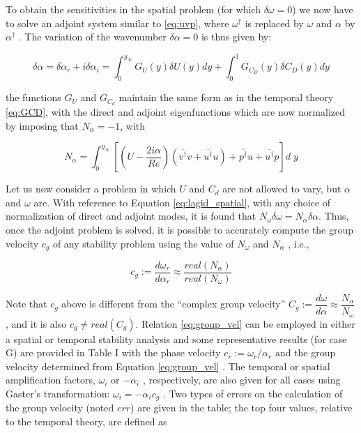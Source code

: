 To obtain the sensitivities in the spatial problem (for which $\delta \omega = 0$) we now have to solve an adjoint
system similar to \ref{eq:uvp}, where $\omega^{\dagger}$ is replaced by $\omega$ and $\alpha$ by $\alpha^{\dagger}$ . The variation of the wavenumber  $\delta \alpha = 0$ is thus given by:

$$
\delta \alpha =\delta \alpha_r + i \delta \alpha_i= \int_0^{y_{\infty}}  G_U(y) \delta U(y) dy + \int_0^{1}  G_{C_D}(y) \delta C_D(y) dy
$$

the functions $G_U$ and $G_{C_d}$ maintain the same form as in the temporal theory \ref{eq:GCD}, with the direct and
adjoint eigenfunctions which are now normalized by imposing that $N_{\alpha} = -1$, with

$$
N_{\alpha} = \int_0^{y_{\infty}} \left[ \left(U - \dfrac{2i\alpha}{Re}\right) ( \overline{ v^{\dagger}} v +  \overline{ u^{\dagger}} u  )   +  \overline{ p^{\dagger}} u +  \overline{ u^{\dagger}} p  \right] d \; y
$$

Let us now consider a problem in which $U$ and $C_d$ are not allowed to vary, but $\alpha$ and $\omega$ are.
With reference to Equation \ref{eq:lagid_spatial}, with any choice of normalization of direct and adjoint modes, it
is found that $ N_{\omega} \delta \omega = N_{\alpha} \delta \alpha $. Thus, once the adjoint problem is solved, it is possible to accurately
compute the group velocity $c_g$ of any stability problem using the value of $ N_{\omega}$ and $ N_{\alpha}$ , i.e.,

\begin{equation}
c_g := \dfrac{d \omega_r}{d \alpha_r} \approx \dfrac{real(N_{\alpha})}{real(N_{\omega})}
\label{eq:group_vel}
\end{equation}

Note that $c_g$ above is different from the “complex group velocity” $C_g := \dfrac{d \omega}{d \alpha} \approx  \dfrac{N_{\alpha}}{N_{\omega}}$ , and it is also
$c_g \neq real(C_g)$. Relation \ref{eq:group_vel} can be employed in either a spatial or temporal stability analysis and
some representative results (for case G) are provided in Table I with the phase velocity $c_r := \omega_r / \alpha_r$
and the group velocity determined from Equation \ref{eq:group_vel} . The temporal or spatial amplification factors, $\omega_i$ or $-\alpha_i$ , respectively, are also given for all cases using Gaster’s transformation: $\omega_i = - \alpha_i c_g$ .
Two types of errors on the calculation of the group velocity (noted $err$) are given in the table; the top
four values, relative to the temporal theory, are defined as

